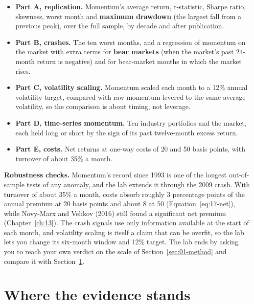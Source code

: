 \begin{itemize}
  \item \textbf{Part A, replication.} Momentum's average return, t-statistic, Sharpe ratio, skewness, worst month and \textbf{maximum drawdown} (the largest fall from a previous peak), over the full sample, by decade and after publication.
  \item \textbf{Part B, crashes.} The ten worst months, and a regression of momentum on the market with extra terms for \textbf{bear markets} (when the market's past 24-month return is negative) and for bear-market months in which the market rises.
  \item \textbf{Part C, volatility scaling.} Momentum scaled each month to a 12\% annual volatility target, compared with raw momentum levered to the same average volatility, so the comparison is about timing, not leverage.
  \item \textbf{Part D, time-series momentum.} Ten industry portfolios and the market, each held long or short by the sign of its past twelve-month excess return.
  \item \textbf{Part E, costs.} Net returns at one-way costs of 20 and 50 basis points, with turnover of about 35\% a month.
\end{itemize}

\label{sec:05-stress}
\textbf{Robustness checks.} Momentum's record since 1993 is one of the longest out-of-sample tests of any anomaly, and the lab extends it through the 2009 crash. With turnover of about 35\% a month, costs absorb roughly 3 percentage points of the annual premium at 20 basis points and about 8 at 50 (Equation~\eqref{eq:17-net}), while Novy-Marx and Velikov (2016) still found a significant net premium (Chapter~\ref{ch:13}). The crash signals use only information available at the start of each month, and volatility scaling is itself a claim that can be overfit, so the lab lets you change its six-month window and 12\% target. The lab ends by asking you to reach your own verdict on the scale of Section~\ref{sec:01-method} and compare it with Section~\ref{sec:05-verdict}.

\section{Where the evidence stands}
\label{sec:05-verdict}

